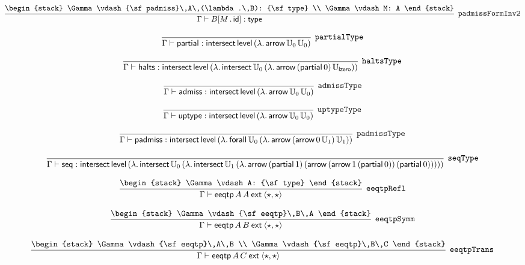 \[
\infer[{\tt padmissFormInv2}]{\Gamma \vdash B[M\,.\,{\sf id}]: {\sf type}}{
\begin{stack}
\Gamma \vdash {\sf padmiss}\,A\,(\lambda .\,B): {\sf type}
\\
\Gamma \vdash M: A
\end{stack}}
\]

\[
\infer[{\tt partialType}]{\Gamma \vdash {\sf partial}: {\sf intersect}\,{\sf level}\,(\lambda .\,{\sf arrow}\,{\Bbb U}_{0}\,{\Bbb U}_{0})}{}
\]

\[
\infer[{\tt haltsType}]{\Gamma \vdash {\sf halts}: {\sf intersect}\,{\sf level}\,(\lambda .\,{\sf intersect}\,{\Bbb U}_{0}\,(\lambda .\,{\sf arrow}\,({\sf partial}\,0)\,{\Bbb U}_{{\sf lzero}}))}{}
\]

\[
\infer[{\tt admissType}]{\Gamma \vdash {\sf admiss}: {\sf intersect}\,{\sf level}\,(\lambda .\,{\sf arrow}\,{\Bbb U}_{0}\,{\Bbb U}_{0})}{}
\]

\[
\infer[{\tt uptypeType}]{\Gamma \vdash {\sf uptype}: {\sf intersect}\,{\sf level}\,(\lambda .\,{\sf arrow}\,{\Bbb U}_{0}\,{\Bbb U}_{0})}{}
\]

\[
\infer[{\tt padmissType}]{\Gamma \vdash {\sf padmiss}: {\sf intersect}\,{\sf level}\,(\lambda .\,{\sf forall}\,{\Bbb U}_{0}\,(\lambda .\,{\sf arrow}\,({\sf arrow}\,0\,{\Bbb U}_{1})\,{\Bbb U}_{1}))}{}
\]

\[
\infer[{\tt seqType}]{\Gamma \vdash {\sf seq}: {\sf intersect}\,{\sf level}\,(\lambda .\,{\sf intersect}\,{\Bbb U}_{0}\,(\lambda .\,{\sf intersect}\,{\Bbb U}_{1}\,(\lambda .\,{\sf arrow}\,({\sf partial}\,1)\,({\sf arrow}\,({\sf arrow}\,1\,({\sf partial}\,0))\,({\sf partial}\,0)))))}{}
\]

\[
\infer[{\tt eeqtpRefl}]{\Gamma \vdash {\sf eeqtp}\,A\,A\:{\sf ext}\:\langle \star ,\star \rangle }{
\begin{stack}
\Gamma \vdash A: {\sf type}
\end{stack}}
\]

\[
\infer[{\tt eeqtpSymm}]{\Gamma \vdash {\sf eeqtp}\,A\,B\:{\sf ext}\:\langle \star ,\star \rangle }{
\begin{stack}
\Gamma \vdash {\sf eeqtp}\,B\,A
\end{stack}}
\]

\[
\infer[{\tt eeqtpTrans}]{\Gamma \vdash {\sf eeqtp}\,A\,C\:{\sf ext}\:\langle \star ,\star \rangle }{
\begin{stack}
\Gamma \vdash {\sf eeqtp}\,A\,B
\\
\Gamma \vdash {\sf eeqtp}\,B\,C
\end{stack}}
\]

